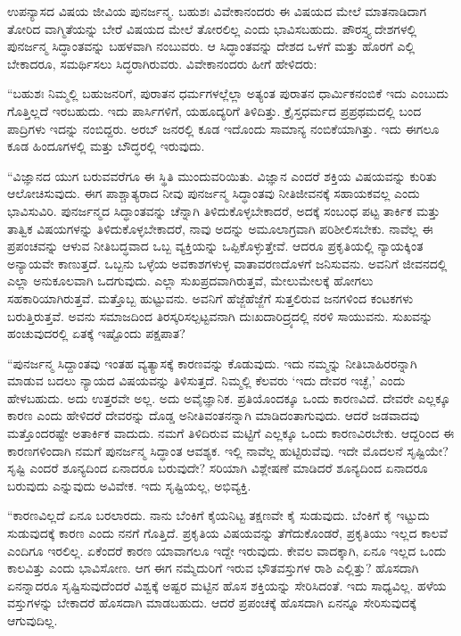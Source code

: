 ಉಪನ್ಯಾಸದ ವಿಷಯ ಜೀವಿಯ ಪುನರ್ಜನ್ಮ. ಬಹುಶಃ ವಿವೇಕಾನಂದರು ಈ ವಿಷಯದ ಮೇಲೆ ಮಾತನಾಡಿದಾಗ ತೋರಿದ ವಾಗ್ಮಿತೆಯನ್ನು ಬೇರೆ ವಿಷಯದ ಮೇಲೆ ತೋರಲಿಲ್ಲ ಎಂದು ಭಾವಿಸಬಹುದು. ಪೌರಸ್ತ್ಯ ದೇಶಗಳಲ್ಲಿ ಪುನರ್ಜನ್ಮ ಸಿದ್ಧಾಂತವನ್ನು ಬಹಳವಾಗಿ ನಂಬುವರು. ಆ ಸಿದ್ಧಾಂತವನ್ನು ದೇಶದ ಒಳಗೆ ಮತ್ತು ಹೊರಗೆ ಎಲ್ಲಿ ಬೇಕಾದರೂ, ಸಮರ್ಥಿಸಲು ಸಿದ್ಧರಾಗಿರುವರು. ವಿವೇಕಾನಂದರು ಹೀಗೆ ಹೇಳಿದರು:

“ಬಹುಶಃ ನಿಮ್ಮಲ್ಲಿ ಬಹುಜನರಿಗೆ, ಪುರಾತನ ಧರ್ಮಗಳಲ್ಲೆಲ್ಲಾ ಅತ್ಯಂತ ಪುರಾತನ ಧಾರ್ಮಿಕನಂಬಿಕೆ ಇದು ಎಂಬುದು ಗೊತ್ತಿಲ್ಲದೆ ಇರಬಹುದು. ಇದು ಪಾರ್ಸಿಗಳಿಗೆ, ಯಹೂದ್ಯರಿಗೆ ತಿಳಿದಿತ್ತು. ಕ್ರೈಸ್ತಧರ್ಮದ ಪ್ರಪ್ರಥಮದಲ್ಲಿ ಬಂದ ಪಾದ್ರಿಗಳು ಇದನ್ನು ನಂಬಿದ್ದರು. ಅರಬ್​ ಜನರಲ್ಲಿ ಕೂಡ ಇದೊಂದು ಸಾಮಾನ್ಯ ನಂಬಿಕೆಯಾಗಿತ್ತು. ಇದು ಈಗಲೂ ಕೂಡ ಹಿಂದೂಗಳಲ್ಲಿ ಮತ್ತು ಬೌದ್ಧರಲ್ಲಿ ಇರುವುದು.

“ವಿಜ್ಞಾನದ ಯುಗ ಬರುವವರೆಗೂ ಈ ಸ್ಥಿತಿ ಮುಂದುವರಿಯಿತು. ವಿಜ್ಞಾನ ಎಂದರೆ ಶಕ್ತಿಯ ವಿಷಯವನ್ನು ಕುರಿತು ಆಲೋಚಿಸುವುದು. ಈಗ ಪಾಶ್ಚಾತ್ಯರಾದ ನೀವು ಪುನರ್ಜನ್ಮ ಸಿದ್ಧಾಂತವು ನೀತಿಜೀವನಕ್ಕೆ ಸಹಾಯಕವಲ್ಲ ಎಂದು ಭಾವಿಸುವಿರಿ. ಪುನರ್ಜನ್ಮದ ಸಿದ್ಧಾಂತವನ್ನು ಚೆನ್ನಾಗಿ ತಿಳಿದುಕೊಳ್ಳಬೇಕಾದರೆ, ಅದಕ್ಕೆ ಸಂಬಂಧ ಪಟ್ಟ ತಾರ್ಕಿಕ ಮತ್ತು ತಾತ್ವಿಕ ವಿಷಯಗಳನ್ನು ತಿಳಿದುಕೊಳ್ಳಬೇಕಾದರೆ, ನಾವು ಅದನ್ನು ಅಮೂಲಾಗ್ರವಾಗಿ ಪರಿಶೀಲಿಸ\break ಬೇಕು. ನಾವೆಲ್ಲ ಈ ಪ್ರಪಂಚವನ್ನು ಆಳುವ ನೀತಿಬದ್ಧವಾದ ಒಬ್ಬ ವ್ಯಕ್ತಿಯನ್ನು ಒಪ್ಪಿಕೊಳ್ಳುತ್ತೇವೆ. ಆದರೂ ಪ್ರಕೃತಿಯಲ್ಲಿ ನ್ಯಾಯಕ್ಕಿಂತ ಅನ್ಯಾಯವೇ ಕಾಣುತ್ತದೆ. ಒಬ್ಬನು ಒಳ್ಳೆಯ ಅವಕಾಶಗಳುಳ್ಳ ವಾತಾವರಣದೊಳಗೆ ಜನಿಸುವನು. ಅವನಿಗೆ ಜೀವನದಲ್ಲಿ ಎಲ್ಲಾ ಅನುಕೂಲವಾಗಿ ಒದಗುವುದು. ಎಲ್ಲಾ ಸುಖಪ್ರದವಾಗಿರುತ್ತವೆ, ಮೇಲುಮೇಲಕ್ಕೆ ಹೋಗಲು ಸಹಕಾರಿಯಾಗಿರುತ್ತವೆ. ಮತ್ತೊಬ್ಬ ಹುಟ್ಟುವನು. ಅವನಿಗೆ ಹೆಜ್ಜೆಹೆಜ್ಜೆಗೆ ಸುತ್ತಲಿರುವ ಜನಗಳಿಂದ ಕಂಟಕಗಳು ಬರುತ್ತಿರುತ್ತವೆ. ಅವನು ಸಮಾಜದಿಂದ ತಿರಸ್ಕರಿಸಲ್ಪಟ್ಟವ\break ನಾಗಿ ದುಃಖದಾರಿದ್ರ್ಯದಲ್ಲಿ ನರಳಿ ಸಾಯುವನು. ಸುಖವನ್ನು ಹಂಚುವುದರಲ್ಲಿ ಏತಕ್ಕೆ ಇಷ್ಟೊಂದು ಪಕ್ಷಪಾತ?

“ಪುನರ್ಜನ್ಮ ಸಿದ್ದಾಂತವು ಇಂತಹ ವ್ಯತ್ಯಾಸಕ್ಕೆ ಕಾರಣವನ್ನು ಕೊಡುವುದು. ಇದು ನಮ್ಮನ್ನು ನೀತಿಬಾಹಿರರನ್ನಾಗಿ ಮಾಡುವ ಬದಲು ನ್ಯಾಯದ ವಿಷಯವನ್ನು ತಿಳಿಸುತ್ತದೆ. ನಿಮ್ಮಲ್ಲಿ ಕೆಲವರು ‘ಇದು ದೇವರ ಇಚ್ಛೆ,’ ಎಂದು ಹೇಳಬಹುದು. ಅದು ಉತ್ತರವೇ ಅಲ್ಲ. ಅದು ಅವೈಜ್ಞಾನಿಕ. ಪ್ರತಿಯೊಂದಕ್ಕೂ ಒಂದು ಕಾರಣವಿದೆ. ದೇವರೇ ಎಲ್ಲಕ್ಕೂ ಕಾರಣ ಎಂದು ಹೇಳಿದರೆ ದೇವರನ್ನು ದೊಡ್ಡ ಅನೀತಿವಂತನನ್ನಾಗಿ ಮಾಡಿದಂತಾಗುವುದು. ಆದರೆ ಜಡವಾದವು ಮತ್ತೊಂದರಷ್ಟೇ ಅತಾರ್ಕಿಕ ವಾದುದು. ನಮಗೆ ತಿಳಿದಿರುವ ಮಟ್ಟಿಗೆ ಎಲ್ಲಕ್ಕೂ ಒಂದು ಕಾರಣವಿರಬೇಕು. ಆದ್ದರಿಂದ ಈ ಕಾರಣಗಳಿಂದಾಗಿ ನಮಗೆ ಪುನರ್ಜನ್ಮ ಸಿದ್ಧಾಂತ ಆವಶ್ಯಕ. ಇಲ್ಲಿ ನಾವೆಲ್ಲ ಹುಟ್ಟಿರುವೆವು. ಇದೇ ಮೊದಲನೆ ಸೃಷ್ಟಿಯೇ? ಸೃಷ್ಟಿ ಎಂದರೆ ಶೂನ್ಯದಿಂದ ಏನಾದರೂ ಬರುವುದೇ? ಸರಿಯಾಗಿ ವಿಶ್ಲೇಷಣೆ ಮಾಡಿದರೆ ಶೂನ್ಯದಿಂದ ಏನಾದರೂ ಬರುವುದು ಎನ್ನುವುದು ಅವಿವೇಕ. ಇದು ಸೃಷ್ಟಿಯಲ್ಲ, ಅಭಿವ್ಯಕ್ತಿ.

“ಕಾರಣವಿಲ್ಲದೆ ಏನೂ ಬರಲಾರದು. ನಾನು ಬೆಂಕಿಗೆ ಕೈಯನಿಟ್ಟ ತಕ್ಷಣವೇ ಕೈ ಸುಡುವುದು. ಬೆಂಕಿಗೆ ಕೈ ಇಟ್ಟುದು ಸುಡುವುದಕ್ಕೆ ಕಾರಣ ಎಂದು ನನಗೆ ಗೊತ್ತಿದೆ. ಪ್ರಕೃತಿಯ ವಿಷಯವನ್ನು ತೆಗೆದುಕೊಂಡರೆ, ಪ್ರಕೃತಿಯು ಇಲ್ಲದ ಕಾಲವೆ ಎಂದಿಗೂ ಇರಲಿಲ್ಲ. ಏಕೆಂದರೆ ಕಾರಣ ಯಾವಾಗಲೂ ಇದ್ದೇ ಇರುವುದು. ಕೇವಲ ವಾದಕ್ಕಾಗಿ, ಏನೂ ಇಲ್ಲದ ಒಂದು ಕಾಲವಿತ್ತು ಎಂದು ಭಾವಿಸೋಣ. ಆಗ ಈಗ ನಮ್ಮೆದುರಿಗೆ ಇರುವ ಭೌತವಸ್ತುಗಳ ರಾಶಿ ಎಲ್ಲಿತ್ತು? ಹೊಸದಾಗಿ ಏನನ್ನಾದರೂ ಸೃಷ್ಟಿಸುವುದೆಂದರೆ ವಿಶ್ವಕ್ಕೆ ಅಷ್ಟರ ಮಟ್ಟಿನ ಹೊಸ ಶಕ್ತಿಯನ್ನು ಸೇರಿಸಿದಂತೆ. ಇದು ಸಾಧ್ಯವಿಲ್ಲ. ಹಳೆಯ ವಸ್ತುಗಳನ್ನು ಬೇಕಾದರೆ ಹೊಸದಾಗಿ ಮಾಡಬಹುದು. ಆದರೆ ಪ್ರಪಂಚಕ್ಕೆ ಹೊಸದಾಗಿ ಏನನ್ನೂ ಸೇರಿಸುವುದಕ್ಕೆ ಆಗುವುದಿಲ್ಲ.

